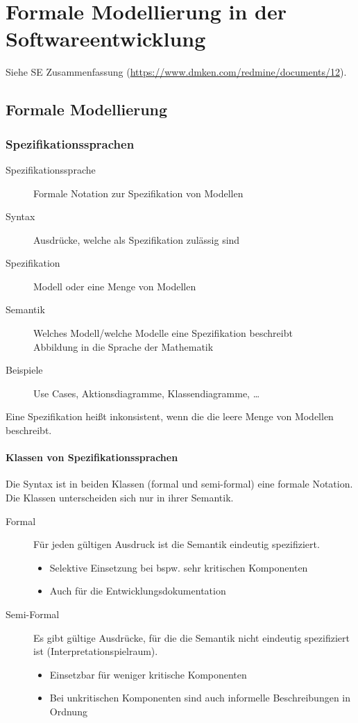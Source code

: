 \chapter{Formale Modellierung in der Softwareentwicklung}
    Siehe SE Zusammenfassung (\url{https://www.dmken.com/redmine/documents/12}).
    
    \section{Formale Modellierung}
	    \subsection{Spezifikationssprachen}
		    \begin{description}
		    	\item[Spezifikationssprache] Formale Notation zur Spezifikation von Modellen
		    	\item[Syntax] Ausdrücke, welche als Spezifikation zulässig sind
		    	\item[Spezifikation] Modell oder eine Menge von Modellen
		    	\item[Semantik] Welches Modell/welche Modelle eine Spezifikation beschreibt \\ Abbildung in die Sprache der Mathematik
		    	\item[Beispiele] Use Cases, Aktionsdiagramme, Klassendiagramme, \dots
		    \end{description}
		    
		    Eine Spezifikation heißt inkonsistent, wenn die die leere Menge von Modellen beschreibt.
		    
		    \subsubsection{Klassen von Spezifikationssprachen}
			    Die Syntax ist in beiden Klassen (formal und semi-formal) eine formale Notation. Die Klassen unterscheiden sich nur in ihrer Semantik.
			    \begin{description}
			    	\item[Formal] Für jeden gültigen Ausdruck ist die Semantik eindeutig spezifiziert.
				    	\begin{itemize}
				    		\item Selektive Einsetzung bei bspw. sehr kritischen Komponenten
				    		\item Auch für die Entwicklungsdokumentation
				    	\end{itemize}
			    	\item[Semi-Formal] Es gibt gültige Ausdrücke, für die die Semantik nicht eindeutig spezifiziert ist (Interpretationspielraum).
				    	\begin{itemize}
				    		\item Einsetzbar für weniger kritische Komponenten
				    		\item Bei unkritischen Komponenten sind auch informelle Beschreibungen in Ordnung
				    	\end{itemize}
			    \end{description}
	    
